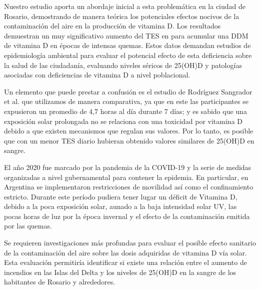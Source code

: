 Nuestro estudio aporta un abordaje inicial a esta problemática en la ciudad de Rosario, demostrando de manera teórica los potenciales efectos nocivos de la contaminación del aire en la producción de vitamina D. Los resultados demuestran un muy significativo aumento del TES  en para acumular una DDM de vitamina D en épocas de intensas quemas. Estos datos demandan estudios de epidemiología ambiental para evaluar el potencial efecto de esta deficiencia sobre la salud de las ciudadanía, evaluando niveles séricos de 25(OH)D y patologías asociadas con deficiencias de vitamina D a nivel poblacional.

Un elemento que puede prestar a confusión es el estudio de Rodríguez Sangrador et al.\cite{Rodriguez_2011} que utilizamos de manera comparativa, ya que en este las participantes se expusieron un promedio de 4,7 horas al día durante 7 días; y es sabido que una exposición solar prolongada no se relaciona con una toxicidad por vitamina D debido a que existen mecanismos que regulan sus valores\cite{Holick_2010}. Por lo tanto, es posible que con un menor TES diario hubieran obtenido valores similares de 25(OH)D en sangre.

El año 2020 fue marcado por la pandemia de la COVID-19 y la serie de medidas organizadas a nivel gubernamental para contener la epidemia. En particular, en Argentina se implementaron restricciones de movilidad así como el confinamiento estricto. Durante este período pudiera tener lugar un déficit de Vitamina D, debido a la poca exposición solar, aunado a la baja intensidad solar UV, las pocas horas de luz por la época invernal y el efecto de la contaminación emitida por las quemas.

Se requieren investigaciones más profundas para evaluar el posible efecto sanitario de la contaminación del aire sobre las dosis adquiridas de vitamina D vía solar. Esta evaluación permitiría identificar si existe una relación entre el aumento de incendios en las Islas del Delta y los niveles de 25(OH)D en la sangre de los habitantes de Rosario y alrededores.
